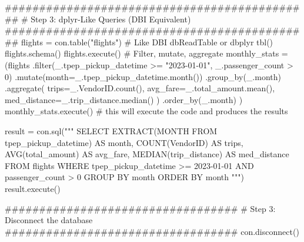 \documentclass[
  letterpaper,
  DIV=11,
  numbers=noendperiod]{scrreprt}
\newenvironment{Shaded}{\begin{snugshade}}{\end{snugshade}}
\newcommand{\BuiltInTok}[1]{\textcolor[rgb]{0.00,0.23,0.31}{#1}}
\newcommand{\CommentTok}[1]{\textcolor[rgb]{0.37,0.37,0.37}{#1}}
\newcommand{\DecValTok}[1]{\textcolor[rgb]{0.68,0.00,0.00}{#1}}
\newcommand{\NormalTok}[1]{\textcolor[rgb]{0.00,0.23,0.31}{#1}}
\newcommand{\OperatorTok}[1]{\textcolor[rgb]{0.37,0.37,0.37}{#1}}
\newcommand{\StringTok}[1]{\textcolor[rgb]{0.13,0.47,0.30}{#1}}
\begin{document}
\begin{Shaded}
\begin{Highlighting}[]
\CommentTok{\#\#\#\#\#\#\#\#\#\#\#\#\#\#\#\#\#\#\#\#\#\#\#\#\#\#\#\#\#\#\#\#\#\#\#\#\#\#\#\#\#\#\#\#\#}
\CommentTok{\# Step 3: dplyr{-}Like Queries (DBI Equivalent)}
\CommentTok{\#\#\#\#\#\#\#\#\#\#\#\#\#\#\#\#\#\#\#\#\#\#\#\#\#\#\#\#\#\#\#\#\#\#\#\#\#\#\#\#\#\#\#\#\#}
\NormalTok{flights }\OperatorTok{=}\NormalTok{ con.table(}\StringTok{"flights"}\NormalTok{)  }\CommentTok{\# Like DBI dbReadTable or dbplyr tbl()}
\NormalTok{flights.schema()}
\NormalTok{flights.execute()}
\CommentTok{\# Filter, mutate, aggregate}
\NormalTok{monthly\_stats }\OperatorTok{=}\NormalTok{ (flights}
\NormalTok{                 .}\BuiltInTok{filter}\NormalTok{(\_.tpep\_pickup\_datetime }\OperatorTok{\textgreater{}=} \StringTok{"2023{-}01{-}01"}\NormalTok{, \_.passenger\_count }\OperatorTok{\textgreater{}} \DecValTok{0}\NormalTok{)}
\NormalTok{                 .mutate(month}\OperatorTok{=}\NormalTok{\_.tpep\_pickup\_datetime.month())}
\NormalTok{                 .group\_by(\_.month)}
\NormalTok{                 .aggregate(}
\NormalTok{                     trips}\OperatorTok{=}\NormalTok{\_.VendorID.count(),}
\NormalTok{                     avg\_fare}\OperatorTok{=}\NormalTok{\_.total\_amount.mean(),}
\NormalTok{                     med\_distance}\OperatorTok{=}\NormalTok{\_.trip\_distance.median()}
\NormalTok{                 )}
\NormalTok{                 .order\_by(\_.month)}
\NormalTok{                )}
\NormalTok{monthly\_stats.execute() }\CommentTok{\# this will execute the code and produces the results}

\NormalTok{result }\OperatorTok{=}\NormalTok{ con.sql(}\StringTok{"""}
\StringTok{    SELECT }
\StringTok{        EXTRACT(MONTH FROM tpep\_pickup\_datetime) AS month,}
\StringTok{        COUNT(VendorID) AS trips,}
\StringTok{        AVG(total\_amount) AS avg\_fare,}
\StringTok{        MEDIAN(trip\_distance) AS med\_distance}
\StringTok{    FROM flights}
\StringTok{    WHERE tpep\_pickup\_datetime \textgreater{}= \textquotesingle{}2023{-}01{-}01\textquotesingle{} AND passenger\_count \textgreater{} 0}
\StringTok{    GROUP BY month}
\StringTok{    ORDER BY month}
\StringTok{"""}\NormalTok{)}
\NormalTok{result.execute()}
\end{Highlighting}
\end{Shaded}

\begin{Shaded}
\begin{Highlighting}[]
\CommentTok{\#\#\#\#\#\#\#\#\#\#\#\#\#\#\#\#\#\#\#\#\#\#\#\#\#\#\#\#\#\#\#\#\#\#}
\CommentTok{\# Step 3: Disconnect the database }
\CommentTok{\#\#\#\#\#\#\#\#\#\#\#\#\#\#\#\#\#\#\#\#\#\#\#\#\#\#\#\#\#\#\#\#\#\#}
\NormalTok{con.disconnect()}
\end{Highlighting}
\end{Shaded}
\end{document}
